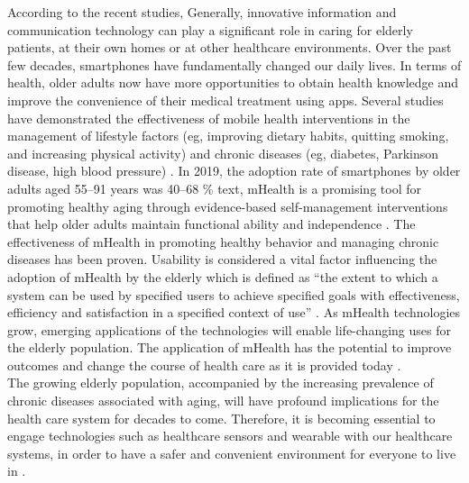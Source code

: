 According to the recent studies,  Generally, innovative information and communication technology can play a significant role in caring for elderly patients, at their own homes or at other healthcare environments\cite{MH17464}. Over the past few decades, smartphones have fundamentally changed our daily lives. In terms of health, older adults now have more opportunities to obtain health knowledge and improve the convenience of their medical treatment using apps. Several studies have demonstrated the effectiveness of mobile health interventions in the management of lifestyle factors (eg, improving dietary habits, quitting smoking, and increasing physical activity) and chronic diseases (eg, diabetes, Parkinson disease, high blood pressure) \cite{chinese_survey}.  In 2019, the adoption rate of smartphones by older adults aged 55–91 years was 40–68 \% text, mHealth is a promising tool for promoting healthy aging through evidence-based self-management interventions that help older adults maintain functional ability and independence \cite{Liaw-2019}. The effectiveness of mHealth in promoting healthy behavior and managing chronic diseases has been proven. Usability is considered a vital factor influencing the adoption of mHealth by the elderly which is defined as “the extent to which a system can be used by specified users to achieve specified goals with effectiveness, efficiency and satisfaction in a specified context of use” \cite{eldersHealthFactors}. As mHealth technologies grow, emerging applications of the technologies will enable life-changing uses for the elderly population. The application of mHealth has the potential to improve outcomes and change the course of health care as it is provided today \cite{mHealthforAgingPopulation}.\\

 The growing elderly population, accompanied by the increasing prevalence of chronic diseases associated with aging, will have profound implications for the health care system for decades to come. Therefore, it is becoming essential to engage technologies such as healthcare sensors and wearable with our healthcare systems, in order to have a safer and convenient environment for everyone to live in \cite{RemoteHealth}.
\\

